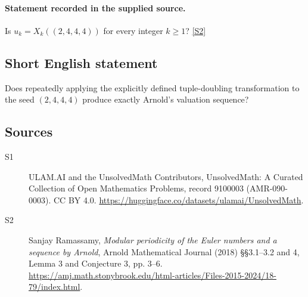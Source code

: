 \documentclass[11pt]{article}
\newcommand{\sref}[2]{\hyperlink{source:#1:#2}{[S#2]}}
\begin{document}
\paragraph{Statement recorded in the supplied source.}
Is $u_k=X_k((2,4,4,4))$ for every integer $k\ge1$? \sref{9100003}{2}
\subsection{Short English statement}
Does repeatedly applying the explicitly defined tuple-doubling transformation to the seed $(2,4,4,4)$ produce exactly Arnold's valuation sequence?
\subsection{Sources}
\begin{description}
\item[\hypertarget{source:9100003:1}{S1}] ULAM.AI and the UnsolvedMath Contributors, UnsolvedMath: A Curated Collection of Open Mathematics Problems, record 9100003 (AMR-090-0003). CC BY 4.0. \url{https://huggingface.co/datasets/ulamai/UnsolvedMath}.
\item[\hypertarget{source:9100003:2}{S2}] Sanjay Ramassamy, \emph{Modular periodicity of the Euler numbers and a sequence by Arnold}, Arnold Mathematical Journal (2018) \S\S3.1--3.2 and 4, Lemma 3 and Conjecture 3, pp. 3--6. \url{https://amj.math.stonybrook.edu/html-articles/Files-2015-2024/18-79/index.html}.
\end{description}
\label{end:9100003}
\end{document}
